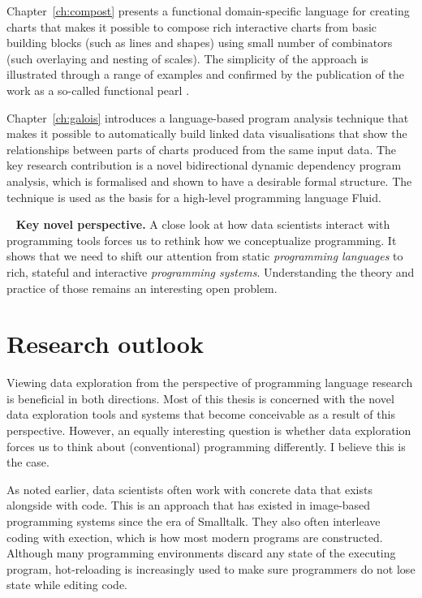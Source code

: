 \documentclass[fleqn,11pt]{report}
\theoremstyle{definition}
\DeclareRobustCommand{\keyideabox}[3]{\begin{tcolorbox}[breakable,
  boxsep=10pt,left=0pt,right=0pt,top=0pt,bottom=0pt,width=\dimexpr\textwidth\relax,
  colback=gray!20,colframe=gray!20,
  enlarge bottom by=5pt,enlarge top by=5pt,
  arc=0pt,outer arc=0pt]
\lettrine[lraise=0.3]{\LARGE #1}{~}
\textbf{#2.} #3
\end{tcolorbox}
}
\begin{document}
Chapter~\ref{ch:compost} presents a functional domain-specific language for creating charts that
makes it possible to compose rich interactive charts from basic building blocks (such as lines
and shapes) using small number of combinators (such overlaying and nesting of scales).
The simplicity of the approach is illustrated through a range of examples and confirmed by the
publication of the work as a so-called functional pearl \citep{gibbons-2010-pearl}.

Chapter~\ref{ch:galois} introduces a language-based program analysis technique that makes it
possible to automatically build linked data visualisations that show the relationships between parts
of charts produced from the same input data. The key research contribution is a novel bidirectional
dynamic dependency program analysis, which is formalised and shown to have a desirable formal
structure. The technique is used as the basis for a high-level programming language Fluid.

\keyideabox{\faRoad}{Key novel perspective}{A close look at how data scientists interact with programming
tools forces us to rethink how we conceptualize programming. It shows that we need to
shift our attention from static \emph{programming languages} to rich, stateful and interactive
\emph{programming systems}. Understanding the theory and practice of those remains an interesting
open problem.}

\section{Research outlook}

Viewing data exploration from the perspective of programming language research is beneficial in
both directions. Most of this thesis is concerned with the novel data exploration tools and
systems that become conceivable as a result of this perspective. However, an equally interesting
question is whether data exploration forces us to think about (conventional) programming differently.
I believe this is the case.

As noted earlier, data scientists often work with concrete data that exists alongside with code.
This is an approach that has existed in image-based programming systems since the era of
Smalltalk. They also often interleave coding with exection, which is how most modern programs
are constructed. Although many programming environments discard any state of the executing program,
hot-reloading is increasingly used to make sure programmers do not lose state while editing code.
\end{document}
